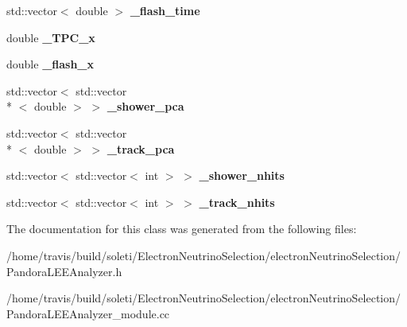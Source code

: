 \begin{DoxyCompactItemize}
\item 
\hypertarget{group__lee_gaecdf711df932ed4823d2c9b222a3e8f4}{std\-::vector$<$ double $>$ {\bfseries \-\_\-flash\-\_\-time}}\label{group__lee_gaecdf711df932ed4823d2c9b222a3e8f4}

\item 
\hypertarget{group__lee_ga8c55bb8de6e184c1adbc191f3d6f12d5}{double {\bfseries \-\_\-\-T\-P\-C\-\_\-x}}\label{group__lee_ga8c55bb8de6e184c1adbc191f3d6f12d5}

\item 
\hypertarget{group__lee_ga5d01876afb52464a4e5f508f58f1f2cc}{double {\bfseries \-\_\-flash\-\_\-x}}\label{group__lee_ga5d01876afb52464a4e5f508f58f1f2cc}

\item 
\hypertarget{group__lee_ga5ed991b6864eb5cfbfb10298ec9cfc64}{std\-::vector$<$ std\-::vector\\*
$<$ double $>$ $>$ {\bfseries \-\_\-shower\-\_\-pca}}\label{group__lee_ga5ed991b6864eb5cfbfb10298ec9cfc64}

\item 
\hypertarget{group__lee_ga9959360c0dd79addecff84a12dba3d49}{std\-::vector$<$ std\-::vector\\*
$<$ double $>$ $>$ {\bfseries \-\_\-track\-\_\-pca}}\label{group__lee_ga9959360c0dd79addecff84a12dba3d49}

\item 
\hypertarget{group__lee_gaabf1f57f8aef33cad913d8597e68ae52}{std\-::vector$<$ std\-::vector$<$ int $>$ $>$ {\bfseries \-\_\-shower\-\_\-nhits}}\label{group__lee_gaabf1f57f8aef33cad913d8597e68ae52}

\item 
\hypertarget{group__lee_ga4dc8bfc10c4854c7bb093bdee63291e9}{std\-::vector$<$ std\-::vector$<$ int $>$ $>$ {\bfseries \-\_\-track\-\_\-nhits}}\label{group__lee_ga4dc8bfc10c4854c7bb093bdee63291e9}

\end{DoxyCompactItemize}


The documentation for this class was generated from the following files\-:\begin{DoxyCompactItemize}
\item 
/home/travis/build/soleti/\-Electron\-Neutrino\-Selection/electron\-Neutrino\-Selection/Pandora\-L\-E\-E\-Analyzer.\-h\item 
/home/travis/build/soleti/\-Electron\-Neutrino\-Selection/electron\-Neutrino\-Selection/Pandora\-L\-E\-E\-Analyzer\-\_\-module.\-cc\end{DoxyCompactItemize}
